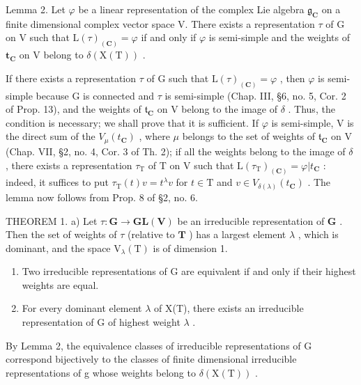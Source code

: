 Lemma 2. Let \(\varphi\) be a linear representation of the complex Lie algebra \(\mathfrak{g}_{\mathbf{C}}\) on a finite dimensional complex vector space V. There exists a representation \(\tau\) of G on V such that \(\mathrm{L}(\tau)_{(\mathbf{C})} = \varphi\) if and only if \(\varphi\) is semi-simple and the weights of \(\mathbf{t}_{\mathbf{C}}\) on V belong to \(\delta (\mathrm{X(T)})\) .

If there exists a representation \(\tau\) of G such that \(\mathrm{L}(\tau)_{(\mathbf{C})} = \varphi\) , then \(\varphi\) is semi-simple because G is connected and \(\tau\) is semi-simple (Chap. III, §6, no. 5, Cor. 2 of Prop. 13), and the weights of \(\mathfrak{t}_{\mathbf{C}}\) on V belong to the image of \(\delta\) . Thus, the condition is necessary; we shall prove that it is sufficient. If \(\varphi\) is semi-simple, V is the direct sum of the \(V_{\mu}(t_{\mathbf{C}})\) , where \(\mu\) belongs to the set of weights of \(\mathfrak{t}_{\mathbf{C}}\) on V (Chap. VII, §2, no. 4, Cor. 3 of Th. 2); if all the weights belong to the image of \(\delta\) , there exists a representation \(\tau_{\mathrm{T}}\) of T on V such that \(\mathrm{L}(\tau_{\mathrm{T}})_{(\mathbf{C})} = \varphi |t_{\mathbf{C}}\) : indeed, it suffices to put \(\tau_{\mathrm{T}}(t)v = t^{\lambda}v\) for \(t \in \mathrm{T}\) and \(v \in V_{\delta(\lambda)}(t_{\mathbf{C}})\) . The lemma now follows from Prop. 8 of §2, no. 6.

THEOREM 1. a) Let \(\tau : \mathbf{G} \to \mathbf{GL}(\mathbf{V})\) be an irreducible representation of \(\mathbf{G}\) . Then the set of weights of \(\tau\) (relative to \(\mathbf{T}\) ) has a largest element \(\lambda\) , which is dominant, and the space \(\mathrm{V}_{\lambda}(\mathrm{T})\) is of dimension 1.

\begin{enumerate}
\def\labelenumi{\alph{enumi})}
\setcounter{enumi}{1}
\item
  Two irreducible representations of G are equivalent if and only if their highest weights are equal.
\item
  For every dominant element \(\lambda\) of X(T), there exists an irreducible representation of G of highest weight \(\lambda\) .
\end{enumerate}

By Lemma 2, the equivalence classes of irreducible representations of G correspond bijectively to the classes of finite dimensional irreducible representations of g whose weights belong to \(\delta(\mathrm{X}(\mathrm{T}))\) .

